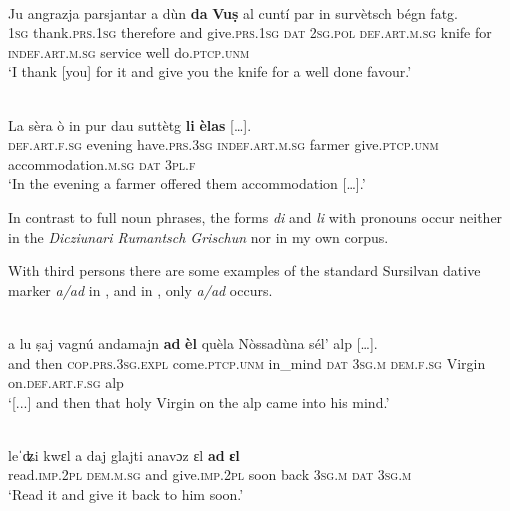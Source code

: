 \ea\label{}
\\
\gll  Ju angrazja parsjantar a dùn \textbf{da} \textbf{Vuṣ} al cuntí par in survètsch bégn fatg.\\
    \textsc{1sg} thank.\textsc{prs.1sg} therefore and give.\textsc{prs.1sg} \textsc{dat} \textsc{2sg.pol} \textsc{def.art.m.sg} knife for \textsc{indef.art.m.sg} service well do.\textsc{ptcp.unm}\\
\glt `I thank [you] for it and give you the knife for a well done favour.'
\z

 \ea\label{}
\\
\gll  La sèra ò in pur dau suttètg \textbf{li} \textbf{èlas} […].\\
     \textsc{def}.\textsc{art}.\textsc{f}.\textsc{sg} evening have.\textsc{prs}.3\textsc{sg} \textsc{indef}.\textsc{art}.\textsc{m}.\textsc{sg} farmer give.\textsc{ptcp.unm} accommodation.\textsc{m.sg} \textsc{dat} \textsc{3pl.f}\\
\glt `In the evening a farmer offered them accommodation […].'
\z

In contrast to full noun phrases, the forms \textit{di} and \textit{li} with pronouns occur neither in the \textit{Dicziunari Rumantsch Grischun} nor in my own corpus.

With third persons there are some examples of the standard Sursilvan dative marker \textit{a/ad} in \citet{Büchli1966}, and in \citet{Gartner1910}, only \textit{a/ad} occurs.

\ea\label{}
\\
\gll  […] a lu ṣaj vagnú andamajn \textbf{ad} \textbf{èl} quèla Nòssadùna sél’ alp […].\\
{} and then \textsc{cop.prs.3sg.expl} come.\textsc{ptcp.unm} in\_mind \textsc{dat} \textsc{3sg.m} \textsc{dem.f.sg} Virgin on.\textsc{def.art.f.sg} alp \\
\glt `[...] and then that holy Virgin on the alp came into his mind.'
\z

\ea\label{}
\\
\gll leˈʥi kwɛl a daj glajti anavɔz ɛl \textbf{ad} \textbf{ɛl}\\
     read.\textsc{imp.2pl} \textsc{dem.m.sg} and give.\textsc{imp.2pl} soon back \textsc{3sg.m} \textsc{dat} \textsc{3sg.m}\\
\glt `Read it and give it back to him soon.'
\z

